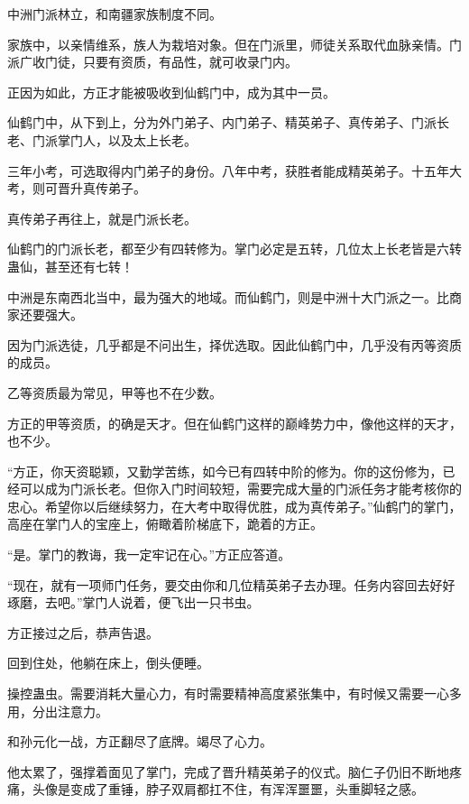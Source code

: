 
\begin{this_body}

中洲门派林立，和南疆家族制度不同。

家族中，以亲情维系，族人为栽培对象。但在门派里，师徒关系取代血脉亲情。门派广收门徒，只要有资质，有品性，就可收录门内。

正因为如此，方正才能被吸收到仙鹤门中，成为其中一员。

仙鹤门中，从下到上，分为外门弟子、内门弟子、精英弟子、真传弟子、门派长老、门派掌门人，以及太上长老。

三年小考，可选取得内门弟子的身份。八年中考，获胜者能成精英弟子。十五年大考，则可晋升真传弟子。

真传弟子再往上，就是门派长老。

仙鹤门的门派长老，都至少有四转修为。掌门必定是五转，几位太上长老皆是六转蛊仙，甚至还有七转！

中洲是东南西北当中，最为强大的地域。而仙鹤门，则是中洲十大门派之一。比商家还要强大。

因为门派选徒，几乎都是不问出生，择优选取。因此仙鹤门中，几乎没有丙等资质的成员。

乙等资质最为常见，甲等也不在少数。

方正的甲等资质，的确是天才。但在仙鹤门这样的巅峰势力中，像他这样的天才，也不少。

“方正，你天资聪颖，又勤学苦练，如今已有四转中阶的修为。你的这份修为，已经可以成为门派长老。但你入门时间较短，需要完成大量的门派任务才能考核你的忠心。希望你以后继续努力，在大考中取得优胜，成为真传弟子。”仙鹤门的掌门，高座在掌门人的宝座上，俯瞰着阶梯底下，跪着的方正。

“是。掌门的教诲，我一定牢记在心。”方正应答道。

“现在，就有一项师门任务，要交由你和几位精英弟子去办理。任务内容回去好好琢磨，去吧。”掌门人说着，便飞出一只书虫。

方正接过之后，恭声告退。

回到住处，他躺在床上，倒头便睡。

操控蛊虫。需要消耗大量心力，有时需要精神高度紧张集中，有时候又需要一心多用，分出注意力。

和孙元化一战，方正翻尽了底牌。竭尽了心力。

他太累了，强撑着面见了掌门，完成了晋升精英弟子的仪式。脑仁子仍旧不断地疼痛，头像是变成了重锤，脖子双肩都扛不住，有浑浑噩噩，头重脚轻之感。


\end{this_body}
